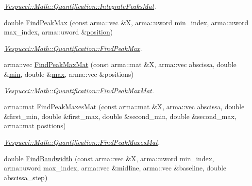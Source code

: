 \begin{DoxyCompactItemize}
\begin{DoxyCompactList}\small\item\em \hyperlink{namespace_vespucci_1_1_math_1_1_quantification_a69e656fff0fae8013961de06b6ff72cc}{Vespucci\+::\+Math\+::\+Quantification\+::\+Integrate\+Peaks\+Mat}. \end{DoxyCompactList}\item 
double \hyperlink{namespace_vespucci_1_1_math_1_1_quantification_a67d066d37ce165ac3e8c04d97436363c}{Find\+Peak\+Max} (const arma\+::vec \&X, arma\+::uword min\+\_\+index, arma\+::uword max\+\_\+index, arma\+::uword \&\hyperlink{namespace_vespucci_1_1_math_a62f5e835cad1e15513494a5a48e028ae}{position})
\begin{DoxyCompactList}\small\item\em \hyperlink{namespace_vespucci_1_1_math_1_1_quantification_a67d066d37ce165ac3e8c04d97436363c}{Vespucci\+::\+Math\+::\+Quantification\+::\+Find\+Peak\+Max}. \end{DoxyCompactList}\item 
arma\+::vec \hyperlink{namespace_vespucci_1_1_math_1_1_quantification_ac8a29afbde382eddd90a15749a8c3151}{Find\+Peak\+Max\+Mat} (const arma\+::mat \&X, arma\+::vec abscissa, double \&\hyperlink{namespace_vespucci_1_1_math_a884dc00603c6aed8e2ee23988c429c64}{min}, double \&\hyperlink{namespace_vespucci_1_1_math_a3d8f536b4465a4bacce89a51e3854daf}{max}, arma\+::vec \&positions)
\begin{DoxyCompactList}\small\item\em \hyperlink{namespace_vespucci_1_1_math_1_1_quantification_ac8a29afbde382eddd90a15749a8c3151}{Vespucci\+::\+Math\+::\+Quantification\+::\+Find\+Peak\+Max\+Mat}. \end{DoxyCompactList}\item 
arma\+::mat \hyperlink{namespace_vespucci_1_1_math_1_1_quantification_a6b4ad9737e416fb31ffc736465c3e87d}{Find\+Peak\+Maxes\+Mat} (const arma\+::mat \&X, arma\+::vec abscissa, double \&first\+\_\+min, double \&first\+\_\+max, double \&second\+\_\+min, double \&second\+\_\+max, arma\+::mat positions)
\begin{DoxyCompactList}\small\item\em \hyperlink{namespace_vespucci_1_1_math_1_1_quantification_a6b4ad9737e416fb31ffc736465c3e87d}{Vespucci\+::\+Math\+::\+Quantification\+::\+Find\+Peak\+Maxes\+Mat}. \end{DoxyCompactList}\item 
double \hyperlink{namespace_vespucci_1_1_math_1_1_quantification_a9ae95323be0190407aac32ec87605352}{Find\+Bandwidth} (const arma\+::vec \&X, arma\+::uword min\+\_\+index, arma\+::uword max\+\_\+index, arma\+::vec \&midline, arma\+::vec \&baseline, double abscissa\+\_\+step)

\end{DoxyCompactItemize}
